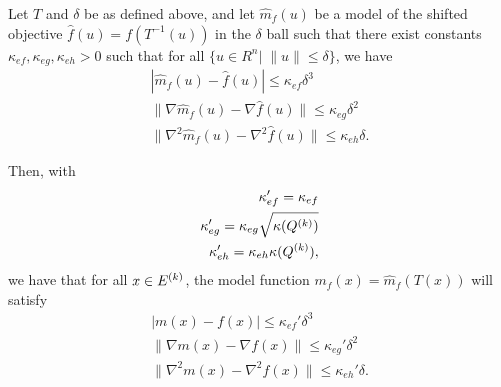 \begin{theorem}
Let $T$ and $\delta$ be as defined above, and let $\hat m_f(u)$ be a model of the shifted objective $\hat f(u) = f(T^{-1}(u))$ in the $\delta$ ball such that
there exist constants $\kappa_{ef}, \kappa_{eg}, \kappa_{eh} > 0$ such that for all $\{u \in R^n | \;\|u\| \le \delta \}$, we have
\begin{align*}
|\hat m_f(u) - \hat f(u)| \le \kappa_{ef} \delta^3\\
\|\nabla \hat m_f(u) - \nabla \hat f(u)\| \le \kappa_{eg}\delta^2\\
\|\nabla^2 \hat m_f(u) - \nabla^2 \hat f(u)\| \le \kappa_{eh}\delta.
\end{align*}

Then, with
\begin{align*}
\kappa_{ef}' = \kappa_{ef} \\
\kappa_{eg}' = \kappa_{eg}\sqrt{\kappa({Q^{(k)}})} \\
\kappa_{eh}' = \kappa_{eh}\kappa({Q^{(k)}}),
\end{align*}
we have that for all $x \in {E^{(k)}}$,
the model function $m_f(x) = \hat m_f(T(x))$ will satisfy
\begin{align*}
| m(x) - f(x)| \le \kappa_{ef}'\delta^3 \\
\|\nabla  m(x) - \nabla  f(x)\| \le \kappa_{eg}'\delta^2 \\
\|\nabla^2 m(x) - \nabla^2 f(x)\| \le \kappa_{eh}'\delta.
\end{align*}
\end{theorem}

